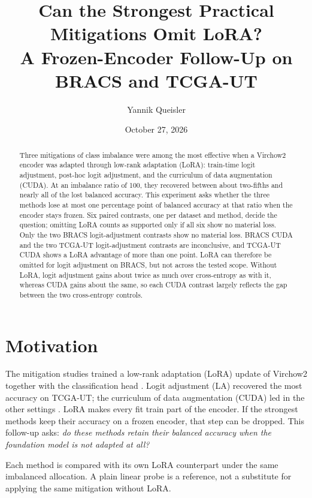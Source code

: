 \documentclass[11pt]{article}
\title{Can the Strongest Practical Mitigations Omit {LoRA}?\\A Frozen-Encoder Follow-Up on {BRACS} and {TCGA-UT}}
\author{Yannik Queisler}
\date{October 27, 2026}
\begin{document}
\raggedbottom
{}
\setlength{\emergencystretch}{2em}
\maketitle
\begin{abstract}
\noindent Three mitigations of class imbalance were among the most effective when a Virchow2 encoder was adapted through low-rank adaptation (LoRA): train-time logit adjustment, post-hoc logit adjustment, and the curriculum of data augmentation (CUDA). At an imbalance ratio of 100, they recovered between about two-fifths and nearly all of the lost balanced accuracy. This experiment asks whether the three methods lose at most one percentage point of balanced accuracy at that ratio when the encoder stays frozen. Six paired contrasts, one per dataset and method, decide the question; omitting LoRA counts as supported only if all six show no material loss. Only the two BRACS logit-adjustment contrasts show no material loss. BRACS CUDA and the two TCGA-UT logit-adjustment contrasts are inconclusive, and TCGA-UT CUDA shows a LoRA advantage of more than one point. LoRA can therefore be omitted for logit adjustment on BRACS, but not across the tested scope. Without LoRA, logit adjustment gains about twice as much over cross-entropy as with it, whereas CUDA gains about the same, so each CUDA contrast largely reflects the gap between the two cross-entropy controls.
\end{abstract}

\section{Motivation}
\label{sec:motivation}
The mitigation studies trained a low-rank adaptation (LoRA) update of Virchow2 \citep{zimmermann2024virchow2} together with the classification head \citep{queisler2026mitigationBracs,queisler2026mitigationTcga}. Logit adjustment (LA) recovered the most accuracy on TCGA-UT; the curriculum of data augmentation (CUDA) \citep{ahn2023cuda} led in the other settings \citep{queisler2026mitigationMethods}. LoRA makes every fit train part of the encoder. If the strongest methods keep their accuracy on a frozen encoder, that step can be dropped. This follow-up asks: \emph{do these methods retain their balanced accuracy when the foundation model is not adapted at all?}

Each method is compared with its own LoRA counterpart under the same imbalanced allocation. A plain linear probe is a reference, not a substitute for applying the same mitigation without LoRA.
\end{document}
